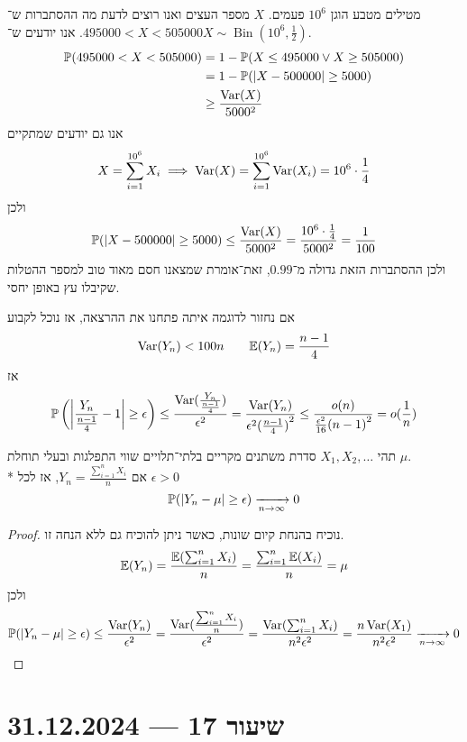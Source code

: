 \begin{example}
	מטילים מטבע הוגן $10^6$ פעמים.
	$X$ מספר העצים ואנו רוצים לדעת מה ההסתברות ש־$495000 < X < 505000$. אנו יודעים ש־$X \sim \operatorname{Bin}(10^6, \frac{1}{2})$.
	\begin{align*}
		\mathbb{P}(495000 < X < 505000)
		& = 1 - \mathbb{P}(X \le 495000 \lor X \ge 505000) \\
		& = 1 - \mathbb{P}(|X - 500000| \ge 5000) \\
		& \ge \frac{\operatorname{Var}(X)}{5000^2}
	\end{align*}
	אנו גם יודעים שמתקיים
	\[
		X = \sum_{i = 1}^{10^6} X_i
		\implies
		\operatorname{Var}(X) = \sum_{i = 1}^{10^6} \operatorname{Var}(X_i) = 10^6 \cdot \frac{1}{4}
	\]
	ולכן
	\[
		\mathbb{P}(|X - 500000| \ge 5000)
		\le \frac{\operatorname{Var}(X)}{5000^2}
		= \frac{10^6 \cdot \frac{1}{4}}{5000^2}
		= \frac{1}{100}
	\]
	ולכן ההסתברות הזאת גדולה מ־$0.99$, זאת־אומרת שמצאנו חסם מאוד טוב למספר ההטלות שקיבלו עץ באופן יחסי.
\end{example}
\begin{example}
	אם נחזור לדוגמה איתה פתחנו את ההרצאה, אז נוכל לקבוע
	\[
		\operatorname{Var}(Y_n) < 100n
		\qquad
		\mathbb{E}(Y_n) = \frac{n - 1}{4}
	\]
	אז
	\[
		\mathbb{P}\left(\left\lvert\frac{Y_n}{\frac{n - 1}{4}} - 1\right\rvert \ge \epsilon\right)
		\le \frac{\operatorname{Var}(\frac{Y_n}{\frac{n - 1}{4}})}{\epsilon^2}
		= \frac{\operatorname{Var}(Y_n)}{\epsilon^2 {(\frac{n - 1}{4})}^2}
		\le \frac{o(n)}{\frac{\epsilon^2}{16} {(n - 1)}^2}
		= o(\frac{1}{n})
	\]
\end{example}
\begin{theorem}
	תהי $X_1, X_2, \dots$ סדרת משתנים מקריים בלתי־תלויים שווי התפלגות ובעלי תוחלת $\mu$. \\*
	אם $Y_n = \frac{\sum_{i = 1}^{n} X_i}{n}$, אז לכל $\epsilon > 0$
	\[
		\mathbb{P}(|Y_n - \mu| \ge \epsilon) \xrightarrow[n \to \infty]{} 0
	\]
\end{theorem}
\begin{proof}
	נוכיח בהנחת קיום שונות, כאשר ניתן להוכיח גם ללא הנחה זו.
	\[
		\mathbb{E}(Y_n)
		= \frac{\mathbb{E}(\sum_{i = 1}^{n} X_i)}{n}
		= \frac{\sum_{i = 1}^{n} \mathbb{E}(X_i)}{n}
		= \mu
	\]
	ולכן
	\[
		\mathbb{P}(|Y_n - \mu| \ge \epsilon)
		\le \frac{\operatorname{Var}(Y_n)}{\epsilon^2}
		= \frac{\operatorname{Var}(\frac{\sum_{i = 1}^{n} X_i}{n})}{\epsilon^2}
		= \frac{\operatorname{Var}(\sum_{i = 1}^{n} X_i)}{n^2 \epsilon^2}
		= \frac{n\operatorname{Var}(X_1)}{n^2 \epsilon^2}
		\xrightarrow[n \to \infty]{} 0
	\]
\end{proof}

\section{שיעור 17 --- 31.12.2024}
